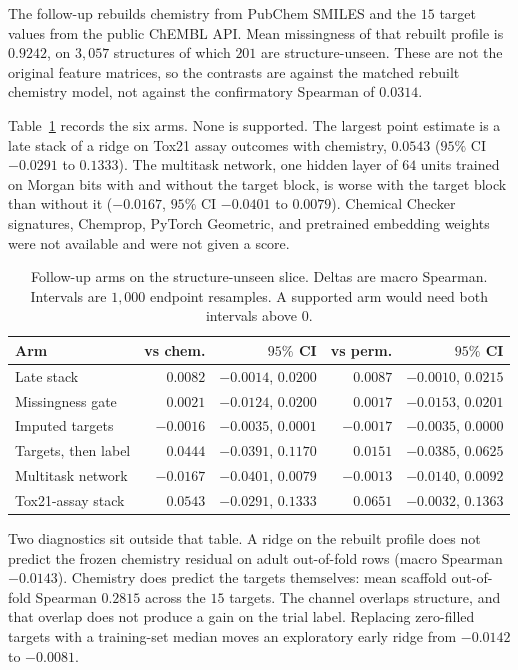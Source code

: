 \documentclass[10pt]{article}
\begin{document}
The follow-up rebuilds chemistry from PubChem SMILES and the $15$ target values from the public ChEMBL API.
Mean missingness of that rebuilt profile is $0.9242$, on $3{,}057$ structures of which $201$ are structure-unseen.
These are not the original feature matrices, so the contrasts are against the matched rebuilt chemistry model, not against the confirmatory Spearman of $0.0314$.

Table~\ref{tab:v5} records the six arms.
None is supported.
The largest point estimate is a late stack of a ridge on Tox21 assay outcomes with chemistry, $0.0543$ ($95\%$ CI $-0.0291$ to $0.1333$).
The multitask network, one hidden layer of $64$ units trained on Morgan bits with and without the target block, is worse with the target block than without it ($-0.0167$, $95\%$ CI $-0.0401$ to $0.0079$).
Chemical Checker signatures, Chemprop, PyTorch Geometric, and pretrained embedding weights were not available and were not given a score.

\begin{table}[t]
\caption{Follow-up arms on the structure-unseen slice. Deltas are macro Spearman. Intervals are $1{,}000$ endpoint resamples. A supported arm would need both intervals above $0$.}
\label{tab:v5}
\centering
\small
\begin{tabular}{lrrrr}
\toprule
Arm & vs chem. & $95\%$ CI & vs perm. & $95\%$ CI \\
\midrule
Late stack & $0.0082$ & $-0.0014$, $0.0200$ & $0.0087$ & $-0.0010$, $0.0215$ \\
Missingness gate & $0.0021$ & $-0.0124$, $0.0200$ & $0.0017$ & $-0.0153$, $0.0201$ \\
Imputed targets & $-0.0016$ & $-0.0035$, $0.0001$ & $-0.0017$ & $-0.0035$, $0.0000$ \\
Targets, then label & $0.0444$ & $-0.0391$, $0.1170$ & $0.0151$ & $-0.0385$, $0.0625$ \\
Multitask network & $-0.0167$ & $-0.0401$, $0.0079$ & $-0.0013$ & $-0.0140$, $0.0092$ \\
Tox21-assay stack & $0.0543$ & $-0.0291$, $0.1333$ & $0.0651$ & $-0.0032$, $0.1363$ \\
\bottomrule
\end{tabular}
\end{table}

Two diagnostics sit outside that table.
A ridge on the rebuilt profile does not predict the frozen chemistry residual on adult out-of-fold rows (macro Spearman $-0.0143$).
Chemistry does predict the targets themselves: mean scaffold out-of-fold Spearman $0.2815$ across the $15$ targets.
The channel overlaps structure, and that overlap does not produce a gain on the trial label.
Replacing zero-filled targets with a training-set median moves an exploratory early ridge from $-0.0142$ to $-0.0081$.
\end{document}
